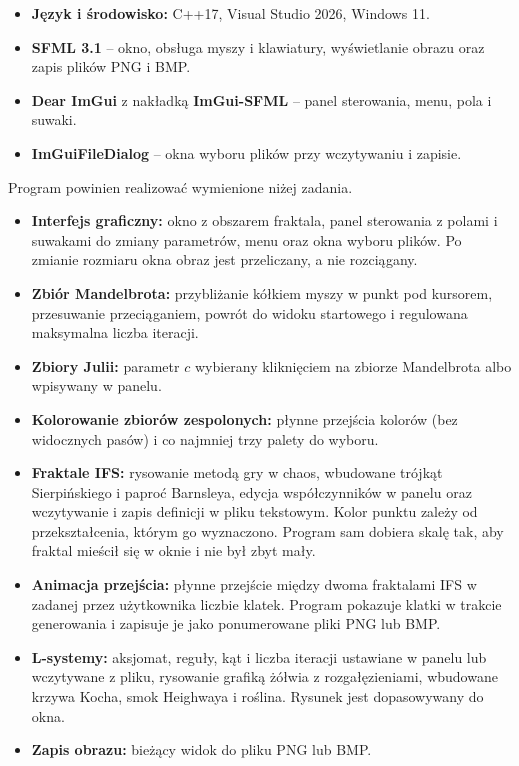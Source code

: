\documentclass[11pt,a4paper]{article}
\newcommand{\naglowek}[1]{\par\bigskip{\large\bfseries\underline{#1}}\par\smallskip}
\begin{document}
\naglowek{Narzędzia}

\begin{itemize}
  \item \textbf{Język i środowisko:} C++17, Visual Studio 2026, Windows 11.
  \item \textbf{SFML 3.1} -- okno, obsługa myszy i klawiatury, wyświetlanie
        obrazu oraz zapis plików PNG i BMP.
  \item \textbf{Dear ImGui} z nakładką \textbf{ImGui-SFML} -- panel sterowania,
        menu, pola i suwaki.
  \item \textbf{ImGuiFileDialog} -- okna wyboru plików przy wczytywaniu
        i zapisie.
\end{itemize}

\naglowek{Wymagania podstawowe}

Program powinien realizować wymienione niżej zadania.

\begin{itemize}
  \item \textbf{Interfejs graficzny:} okno z obszarem fraktala, panel
        sterowania z polami i suwakami do zmiany parametrów, menu oraz okna
        wyboru plików. Po zmianie rozmiaru okna obraz jest przeliczany, a nie
        rozciągany.
  \item \textbf{Zbiór Mandelbrota:} przybliżanie kółkiem myszy w punkt pod
        kursorem, przesuwanie przeciąganiem, powrót do widoku startowego
        i regulowana maksymalna liczba iteracji.
  \item \textbf{Zbiory Julii:} parametr $c$ wybierany kliknięciem na zbiorze
        Mandelbrota albo wpisywany w panelu.
  \item \textbf{Kolorowanie zbiorów zespolonych:} płynne przejścia kolorów
        (bez widocznych pasów) i co najmniej trzy palety do wyboru.
  \item \textbf{Fraktale IFS:} rysowanie metodą gry w chaos, wbudowane trójkąt
        Sierpińskiego i paproć Barnsleya, edycja współczynników w panelu oraz
        wczytywanie i zapis definicji w pliku tekstowym. Kolor punktu zależy od
        przekształcenia, którym go wyznaczono. Program sam dobiera skalę tak,
        aby fraktal mieścił się w oknie i nie był zbyt mały.
  \item \textbf{Animacja przejścia:} płynne przejście między dwoma fraktalami
        IFS w zadanej przez użytkownika liczbie klatek. Program pokazuje klatki
        w trakcie generowania i zapisuje je jako ponumerowane pliki PNG lub BMP.
  \item \textbf{L-systemy:} aksjomat, reguły, kąt i liczba iteracji ustawiane
        w panelu lub wczytywane z pliku, rysowanie grafiką żółwia
        z rozgałęzieniami, wbudowane krzywa Kocha, smok Heighwaya i roślina.
        Rysunek jest dopasowywany do okna.
  \item \textbf{Zapis obrazu:} bieżący widok do pliku PNG lub BMP.
\end{itemize}
\end{document}
